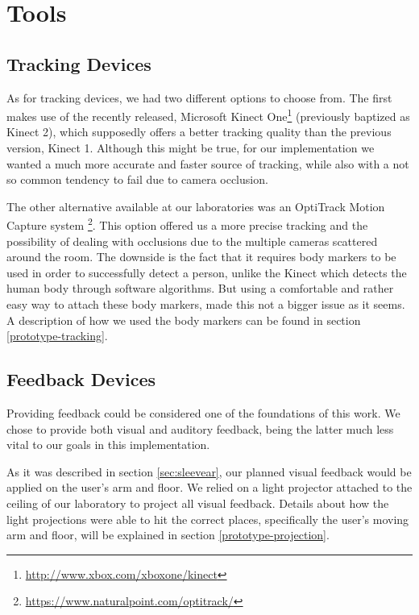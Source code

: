 \section{Tools}
\label{sec:impl:tools}

\subsection{Tracking Devices}
\label{sec:impl:trackdevices}

As for tracking devices, we had two different options to choose from.
The first makes use of the recently released, Microsoft Kinect One\footnote{\url{http://www.xbox.com/xboxone/kinect}} 
(previously baptized as Kinect 2), which supposedly offers a better tracking quality than 
the previous version, Kinect 1. Although this might be true, for our implementation we wanted a much more accurate and faster source of tracking, while also with a not so common tendency to fail due to camera occlusion.

The other alternative available at our laboratories was an OptiTrack Motion Capture system \footnote{\url{https://www.naturalpoint.com/optitrack/}}. 
This option offered us a more precise tracking and the possibility of dealing with occlusions due to the multiple cameras scattered around the room. 
The downside is the fact that it requires body markers to be used in order to successfully detect a person, unlike the 
Kinect which detects the human body through software algorithms. 
But using a comfortable and rather easy way to attach these body markers, made this not a bigger issue as it seems. 
A description of how we used the body markers can be found in section \ref{prototype-tracking}.



\subsection{Feedback Devices}

Providing feedback could be considered one of the foundations of this work. 
We chose to provide both visual and auditory feedback, being the latter much less vital to our goals in this implementation.

As it was described in section \ref{sec:sleevear}, our planned visual feedback would be applied on the user's arm and floor.
We relied on a light projector attached to the ceiling of our laboratory to project all visual feedback.
Details about how the light projections were able to hit the correct places, specifically the user's moving arm and floor, will be explained in section \ref{prototype-projection}.

